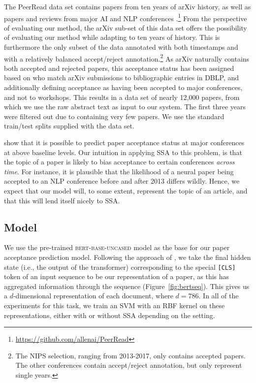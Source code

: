 \documentclass[letterpaper]{article} %
\begin{document}
The PeerRead data set contains papers from ten years of arXiv history, as well as papers and reviews from major AI and NLP conferences \cite{kang18naacl}.\footnote{\url{https://github.com/allenai/PeerRead}}
From the perspective of evaluating our method, the arXiv sub-set of this data set offers the possibility of evaluating our method while adapting to ten years of history.
This is furthermore the only subset of the data annotated with both timestamps and with a relatively balanced accept/reject annotation.\footnote{The NIPS selection, ranging from 2013-2017, only contains accepted papers. The other conferences contain accept/reject annotation, but only represent single years.}
As arXiv naturally contains both accepted and rejected papers, this acceptance status has been assigned based on \citeauthor{sutton:2017} who match arXiv submissions to bibliographic entries in DBLP, and additionally defining acceptance as having been accepted to major conferences, and not to workshops.
This results in a data set of nearly 12,000 papers, from which we use the raw abstract text as input to our system. The first three years were filtered out due to containing very few papers.
We use the standard train/test splits supplied with the data set.

\citeauthor{kang18naacl} show that it is possible to predict paper acceptance status at major conferences at above baseline levels.
Our intuition in applying SSA to this problem, is that the topic of a paper is likely to bias acceptance to certain conferences \textit{across time}.
For instance, it is plausible that the likelihood of a neural paper being accepted to an NLP conference before and after 2013 differs wildly.
Hence, we expect that our model will, to some extent, represent the topic of an article, and that this will lend itself nicely to SSA.

\subsection{Model}
We use the pre-trained \textsc{bert-base-uncased} model as the base for our paper acceptance prediction model.
Following the approach of \citeauthor{bert}, we take the final hidden state (i.e., the output of the transformer) corresponding to the special \texttt{[CLS]} token of an input sequence to be our representation of a paper, as this has aggregated information through the sequence (Figure~\ref{fig:bertseq}).
This gives us a $d$-dimensional representation of each document, where $d=786$.
In all of the experiments for this task, we train an SVM with an RBF kernel on these representations, either with or without SSA depending on the setting.
\end{document}
